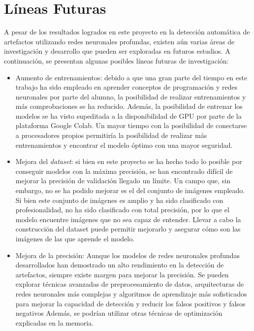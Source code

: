 \documentclass{report}
\begin{document}
 
\chapter{Líneas Futuras}




A pesar de los resultados logrados en este proyecto en la detección automática de artefactos utilizando redes neuronales profundas, existen aún varias áreas de investigación y desarrollo que pueden ser exploradas en futuros estudios. A continuación, se presentan algunas posibles líneas futuras de investigación:

\begin{itemize}

\item Aumento de entrenamientos: debido a que una gran parte del tiempo en este trabajo ha sido empleado en aprender conceptos de programación y redes neuronales por parte del alumno, la posibilidad de realizar entrenamientos y más comprobaciones se ha reducido. Además, la posibilidad de entrenar los modelos se ha visto supeditada a la disponibilidad de GPU por parte de la plataforma Google Colab. Un mayor tiempo con la posibilidad de conectarse a procesadores propios permitiría la posibilidad de realizar más entrenamientos y encontrar el modelo óptimo con una mayor seguridad.

\item Mejora del \textit{dataset}: si bien en este proyecto se ha hecho todo lo posible por conseguir modelos con la máxima precisión, se han encontrado difícil de mejorar la precisión de validación llegado un límite. Un campo que, sin embargo, no se ha podido mejorar es el del conjunto de imágenes empleado. Si bien este conjunto de imágenes es amplio y ha sido clasificado con profesionalidad, no ha sido clasificado con total precisión, por lo que el modelo encuentre imágenes que no sea capaz de entender. Llevar a cabo la construcción del dataset puede permitir mejorarlo y asegurar cómo son las imágenes de las que aprende el modelo.

\item Mejora de la precisión: Aunque los modelos de redes neuronales profundas desarrollados han demostrado un alto rendimiento en la detección de artefactos, siempre existe margen para mejorar la precisión. Se pueden explorar técnicas avanzadas de preprocesamiento de datos, arquitecturas de redes neuronales más complejas y algoritmos de aprendizaje más sofisticados para mejorar la capacidad de detección y reducir los falsos positivos y falsos negativos Además, se podrían utilizar otras técnicas de optimización explicadas en la memoria.


\end{itemize}
\end{document}
